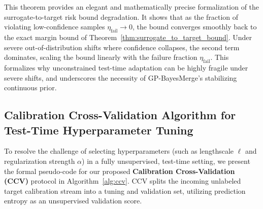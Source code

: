 \documentclass{article}
\theoremstyle{plain}
\theoremstyle{definition}
\theoremstyle{remark}
\begin{document}
This theorem provides an elegant and mathematically precise formalization of the surrogate-to-target risk bound degradation. It shows that as the fraction of violating low-confidence samples $\eta_{\text{fail}} \to 0$, the bound converges smoothly back to the exact margin bound of Theorem~\ref{thm:surrogate_to_target_bound}. Under severe out-of-distribution shifts where confidence collapses, the second term dominates, scaling the bound linearly with the failure fraction $\eta_{\text{fail}}$. This formalizes why unconstrained test-time adaptation can be highly fragile under severe shifts, and underscores the necessity of GP-BayesMerge's stabilizing continuous prior.

\subsection{Calibration Cross-Validation Algorithm for Test-Time Hyperparameter Tuning}
\label{subsec:ccv_algorithm}

To resolve the challenge of selecting hyperparameters (such as lengthscale $\ell$ and regularization strength $\alpha$) in a fully unsupervised, test-time setting, we present the formal pseudo-code for our proposed \textbf{Calibration Cross-Validation (CCV)} protocol in Algorithm~\ref{alg:ccv}. CCV splits the incoming unlabeled target calibration stream into a tuning and validation set, utilizing prediction entropy as an unsupervised validation score.
\end{document}
